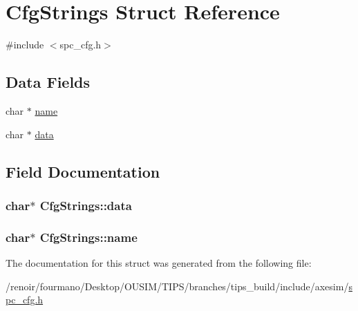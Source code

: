 \hypertarget{structCfgStrings}{
\section{CfgStrings Struct Reference}
\label{structCfgStrings}
}


{\ttfamily \#include $<$spc\_\-cfg.h$>$}\subsection*{Data Fields}
\begin{DoxyCompactItemize}
\item 
char $\ast$ \hyperlink{structCfgStrings_ae242595a7e81b71aa7778196fad8c08a}{name}
\item 
char $\ast$ \hyperlink{structCfgStrings_ab4ed123e084f001ff0dadb43979d8837}{data}
\end{DoxyCompactItemize}


\subsection{Field Documentation}
\hypertarget{structCfgStrings_ab4ed123e084f001ff0dadb43979d8837}{
\subsubsection[{data}]{\setlength{\rightskip}{0pt plus 5cm}char$\ast$ {\bf CfgStrings::data}}}
\label{structCfgStrings_ab4ed123e084f001ff0dadb43979d8837}
\hypertarget{structCfgStrings_ae242595a7e81b71aa7778196fad8c08a}{
\subsubsection[{name}]{\setlength{\rightskip}{0pt plus 5cm}char$\ast$ {\bf CfgStrings::name}}}
\label{structCfgStrings_ae242595a7e81b71aa7778196fad8c08a}


The documentation for this struct was generated from the following file:\begin{DoxyCompactItemize}
\item 
/renoir/fourmano/Desktop/OUSIM/TIPS/branches/tips\_\-build/include/axesim/\hyperlink{spc__cfg_8h}{spc\_\-cfg.h}\end{DoxyCompactItemize}
